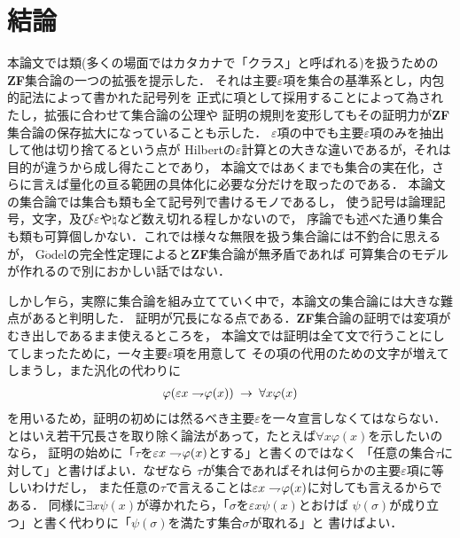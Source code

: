 \chapter{結論}
	本論文では類(多くの場面ではカタカナで「クラス」と呼ばれる)を扱うための{\bf ZF}集合論の一つの拡張を提示した．
	それは主要$\varepsilon$項を集合の基準系とし，内包的記法によって書かれた記号列を
	正式に項として採用することによって為されたし，拡張に合わせて集合論の公理や
	証明の規則を変形してもその証明力が{\bf ZF}集合論の保存拡大になっていることも示した．
	$\varepsilon$項の中でも主要$\varepsilon$項のみを抽出して他は切り捨てるという点が
	Hilbertの$\varepsilon$計算との大きな違いであるが，それは目的が違うから成し得たことであり，
	本論文ではあくまでも集合の実在化，さらに言えば量化の亘る範囲の具体化に必要な分だけを取ったのである．
	本論文の集合論では集合も類も全て記号列で書けるモノであるし，
	使う記号は論理記号，文字，及び$\varepsilon$や$\natural$など数え切れる程しかないので，
	序論でも述べた通り集合も類も可算個しかない．これでは様々な無限を扱う集合論には不釣合に思えるが，
	G$\ddot{\mbox{o}}$delの完全性定理によると{\bf ZF}集合論が無矛盾であれば
	可算集合のモデルが作れるので別におかしい話ではない．
	
	しかし乍ら，実際に集合論を組み立てていく中で，本論文の集合論には大きな難点があると判明した．
	証明が冗長になる点である．{\bf ZF}集合論の証明では変項がむき出しであるまま使えるところを，
	本論文では証明は全て文で行うことにしてしまったために，一々主要$\varepsilon$項を用意して
	その項の代用のための文字が増えてしまうし，また汎化の代わりに
	\begin{align}
		\varphi(\varepsilon x \rightharpoondown\hspace{-0.25em} \varphi(x)) \hspace{0.25em}\rightarrow\hspace{0.25em} \forall x \varphi(x)
	\end{align}
	を用いるため，証明の初めには然るべき主要$\varepsilon$を一々宣言しなくてはならない．
	とはいえ若干冗長さを取り除く論法があって，たとえば$\forall x \varphi(x)$を示したいのなら，
	証明の始めに「$\tau$を$\varepsilon x \rightharpoondown\hspace{-0.25em} \varphi(x)$とする」と書くのではなく
	「任意の集合$\tau$に対して」と書けばよい．なぜなら
	$\tau$が集合であればそれは何らかの主要$\varepsilon$項に等しいわけだし，
	また任意の$\tau$で言えることは$\varepsilon x \rightharpoondown\hspace{-0.25em} \varphi(x)$に対しても言えるからである．
	同様に$\exists x \psi(x)$が導かれたら，「$\sigma$を$\varepsilon x \psi(x)$とおけば
	$\psi(\sigma)$が成り立つ」と書く代わりに「$\psi(\sigma)$を満たす集合$\sigma$が取れる」と
	書けばよい．